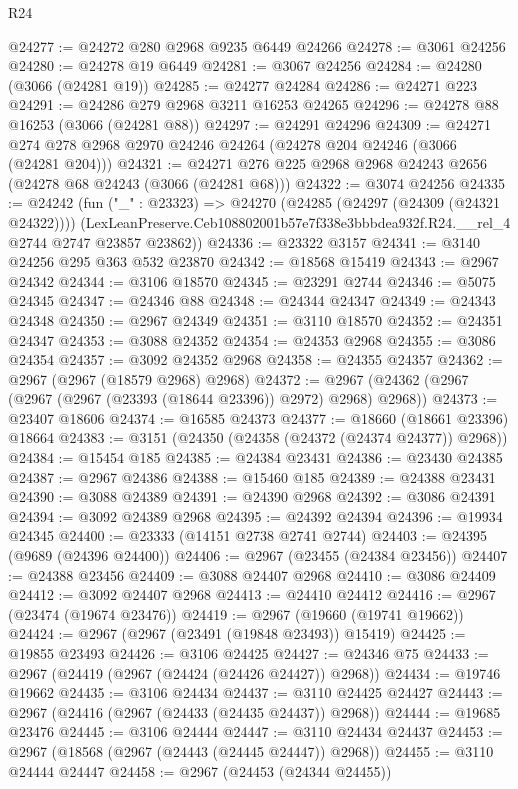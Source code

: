 \begin{lexlean}{R24}
\begin{coremodule}
@24277 := @24272 @280 @2968 @9235 @6449 @24266
@24278 := @3061 @24256
@24280 := @24278 @19 @6449
@24281 := @3067 @24256
@24284 := @24280 (@3066 (@24281 @19))
@24285 := @24277 @24284
@24286 := @24271 @223
@24291 := @24286 @279 @2968 @3211 @16253 @24265
@24296 := @24278 @88 @16253 (@3066 (@24281 @88))
@24297 := @24291 @24296
@24309 := @24271 @274 @278 @2968 @2970 @24246 @24264 (@24278 @204 @24246 (@3066 (@24281 @204)))
@24321 := @24271 @276 @225 @2968 @2968 @24243 @2656 (@24278 @68 @24243 (@3066 (@24281 @68)))
@24322 := @3074 @24256
@24335 := @24242
    (fun ("_" : @23323) =>
    @24270
      (@24285 (@24297 (@24309 (@24321 @24322))))
      (LexLeanPreserve.Ceb108802001b57e7f338e3bbbdea932f.R24.__rel_4 @2744 @2747 @23857 @23862))
@24336 := @23322 @3157
@24341 := @3140 @24256 @295 @363 @532 @23870
@24342 := @18568 @15419
@24343 := @2967 @24342
@24344 := @3106 @18570
@24345 := @23291 @2744
@24346 := @5075 @24345
@24347 := @24346 @88
@24348 := @24344 @24347
@24349 := @24343 @24348
@24350 := @2967 @24349
@24351 := @3110 @18570
@24352 := @24351 @24347
@24353 := @3088 @24352
@24354 := @24353 @2968
@24355 := @3086 @24354
@24357 := @3092 @24352 @2968
@24358 := @24355 @24357
@24362 := @2967 (@2967 (@18579 @2968) @2968)
@24372 := @2967 (@24362 (@2967 (@2967 (@2967 (@23393 (@18644 @23396)) @2972) @2968) @2968))
@24373 := @23407 @18606
@24374 := @16585 @24373
@24377 := @18660 (@18661 @23396) @18664
@24383 := @3151 (@24350 (@24358 (@24372 (@24374 @24377)) @2968))
@24384 := @15454 @185
@24385 := @24384 @23431
@24386 := @23430 @24385
@24387 := @2967 @24386
@24388 := @15460 @185
@24389 := @24388 @23431
@24390 := @3088 @24389
@24391 := @24390 @2968
@24392 := @3086 @24391
@24394 := @3092 @24389 @2968
@24395 := @24392 @24394
@24396 := @19934 @24345
@24400 := @23333 (@14151 @2738 @2741 @2744)
@24403 := @24395 (@9689 (@24396 @24400))
@24406 := @2967 (@23455 (@24384 @23456))
@24407 := @24388 @23456
@24409 := @3088 @24407 @2968
@24410 := @3086 @24409
@24412 := @3092 @24407 @2968
@24413 := @24410 @24412
@24416 := @2967 (@23474 (@19674 @23476))
@24419 := @2967 (@19660 (@19741 @19662))
@24424 := @2967 (@2967 (@23491 (@19848 @23493)) @15419)
@24425 := @19855 @23493
@24426 := @3106 @24425
@24427 := @24346 @75
@24433 := @2967 (@24419 (@2967 (@24424 (@24426 @24427)) @2968))
@24434 := @19746 @19662
@24435 := @3106 @24434
@24437 := @3110 @24425 @24427
@24443 := @2967 (@24416 (@2967 (@24433 (@24435 @24437)) @2968))
@24444 := @19685 @23476
@24445 := @3106 @24444
@24447 := @3110 @24434 @24437
@24453 := @2967 (@18568 (@2967 (@24443 (@24445 @24447)) @2968))
@24455 := @3110 @24444 @24447
@24458 := @2967 (@24453 (@24344 @24455))

\end{coremodule}
\end{lexlean}
